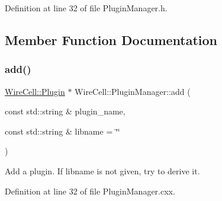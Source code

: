Definition at line 32 of file Plugin\+Manager.\+h.



\subsection{Member Function Documentation}
\mbox{\label{class_wire_cell_1_1_plugin_manager_a91f5a66757079562b579ef7eae374c6d}} 
\subsubsection{\texorpdfstring{add()}{add()}}
{\footnotesize\ttfamily \hyperlink{class_wire_cell_1_1_plugin}{Wire\+Cell\+::\+Plugin} $\ast$ Wire\+Cell\+::\+Plugin\+Manager\+::add (\begin{DoxyParamCaption}\item[{const std\+::string \&}]{plugin\+\_\+name,  }\item[{const std\+::string \&}]{libname = {\ttfamily \char`\"{}\char`\"{}} }\end{DoxyParamCaption})}



Add a plugin. If libname is not given, try to derive it. 



Definition at line 32 of file Plugin\+Manager.\+cxx.

